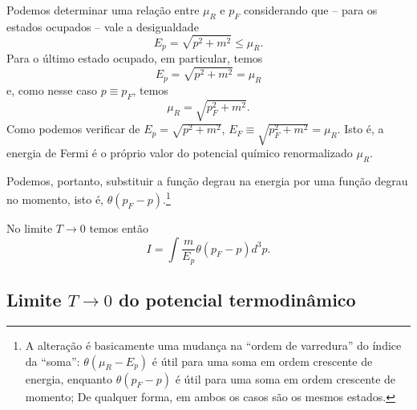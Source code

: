 Podemos determinar uma relação entre $\mu_R$ e $p_F$ considerando que -- para os estados ocupados -- vale a desigualdade
\begin{equation}
	E_p = \sqrt{p^2 + m^2} \leqslant \mu_R.
\end{equation}
%
Para o último estado ocupado, em particular, temos
\begin{equation}
	E_p = \sqrt{p^2 + m^2} = \mu_R
\end{equation}
%
e, como nesse caso $p \equiv p_F$, temos
\begin{equation}
	\mu_R = \sqrt{p_F^2 + m^2}.
\end{equation}
%
Como podemos verificar de $E_p = \sqrt{p^2 + m^2}$, $E_F \equiv \sqrt{p_F^2 + m^2} = \mu_R$. Isto é, a energia de Fermi é o próprio valor do potencial químico renormalizado $\mu_R$.

Podemos, portanto, substituir a função degrau na energia por uma função degrau no momento, isto é, $\theta(p_F - p)$.\footnote{A alteração é basicamente uma mudança na ``ordem de varredura'' do índice da ``soma'': $\theta(\mu_R - E_p)$ é útil para uma soma em ordem crescente de energia, enquanto $\theta(p_F - p)$ é útil para uma soma em ordem crescente de momento; De qualquer forma, em ambos os casos são os mesmos estados.}

No limite $T \to 0$ temos então
\begin{equation}
	I = \int \frac{m}{E_p} \theta(p_F - p) d^3p.
\end{equation}

\subsection{Limite $T \to 0$ do potencial termodinâmico}

